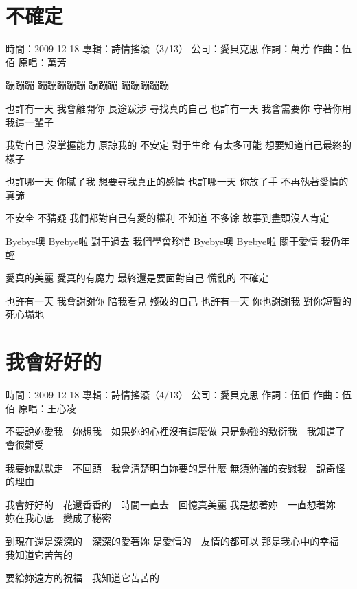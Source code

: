 \documentclass[UTF8,a4paper,oneside,twocolumn,12pt]{ctexbook}
\newcommand{\infopair}[2]{\textbullet #1：#2}
\newcommand{\zc}[1][伍佰]{\infopair{作詞}{#1}}
\newcommand{\zq}[1][伍佰]{\infopair{作曲}{#1}}
\newcommand{\zj}[1]{\infopair{專輯}{#1}}
\newcommand{\yc}[1]{\infopair{原唱}{#1}}
\newcommand{\sj}[1]{\infopair{時間}{#1}}
\newcommand{\gs}[1]{\infopair{公司}{#1}}
\newenvironment{info}{\begin{flushleft}\kaishu
	}
	{\end{flushleft}\normalsize\yahei\par}
\newenvironment{lyric}{
	}
{}
\begin{document}
\section{不確定}
\begin{info}
	\sj{2009-12-18}
	\zj{詩情搖滾（3/13）}
	\gs{愛貝克思}
	\zc[萬芳]
	\zq
	\yc{萬芳}
\end{info}
\begin{lyric}
	蹦蹦蹦 蹦蹦蹦蹦蹦 蹦蹦蹦 蹦蹦蹦蹦蹦

	也許有一天 我會離開你
	長途跋涉 尋找真的自己
	也許有一天 我會需要你
	守著你用我這一輩子

	我對自己 沒掌握能力
	原諒我的 不安定
	對于生命 有太多可能
	想要知道自己最終的樣子

	也許哪一天 你膩了我
	想要尋我真正的感情
	也許哪一天 你放了手
	不再執著愛情的真諦

	不安全 不猜疑
	我們都對自己有愛的權利
	不知道 不多馀
	故事到盡頭沒人肯定

	Byebye噢 Byebye啦
	對于過去 我們學會珍惜
	Byebye噢 Byebye啦
	關于愛情 我仍年輕

	愛真的美麗 愛真的有魔力
	最終還是要面對自己
	慌亂的 不確定

	也許有一天 我會謝謝你
	陪我看見 殘破的自己
	也許有一天 你也謝謝我
	對你短暫的死心塌地
\end{lyric}

\section{我會好好的}
\begin{info}
	\sj{2009-12-18}
	\zj{詩情搖滾（4/13）}
	\gs{愛貝克思}
	\zc
	\zq
	\yc{王心凌}
\end{info}
\begin{lyric}
	不要說妳愛我　妳想我　如果妳的心裡沒有這麼做
	只是勉強的敷衍我　我知道了會很難受

	我要妳默默走　不回頭　我會清楚明白妳要的是什麼
	無須勉強的安慰我　說奇怪的理由

	我會好好的　花還香香的　時間一直去　回憶真美麗
	我是想著妳　一直想著妳　妳在我心底　變成了秘密

	到現在還是深深的　深深的愛著妳
	是愛情的　友情的都可以
	那是我心中的幸福　我知道它苦苦的

	要給妳遠方的祝福　我知道它苦苦的
\end{lyric}
\end{document}
